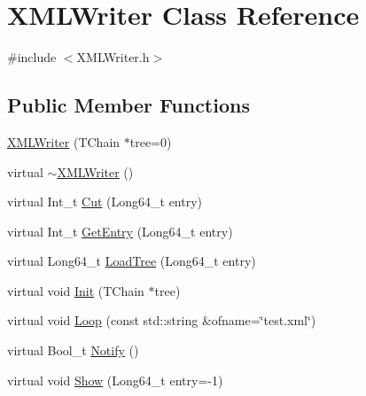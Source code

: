 \hypertarget{classXMLWriter}{}\section{X\+M\+L\+Writer Class Reference}
\label{classXMLWriter}


{\ttfamily \#include $<$X\+M\+L\+Writer.\+h$>$}

\subsection*{Public Member Functions}
\begin{DoxyCompactItemize}
\item 
\hyperlink{classXMLWriter_a631d31e75126744e81192ac344a2b7dc}{X\+M\+L\+Writer} (T\+Chain $\ast$tree=0)
\item 
virtual \hyperlink{classXMLWriter_a1336f66fb7a5df23cb7a36f86d6716e6}{$\sim$\+X\+M\+L\+Writer} ()
\item 
virtual Int\+\_\+t \hyperlink{classXMLWriter_aea4173005cf384e509c2ef2f3000605c}{Cut} (Long64\+\_\+t entry)
\item 
virtual Int\+\_\+t \hyperlink{classXMLWriter_a599d7b24c232fc328e78be3c6cc3db4e}{Get\+Entry} (Long64\+\_\+t entry)
\item 
virtual Long64\+\_\+t \hyperlink{classXMLWriter_ac26022656f980ea11451578450ab717f}{Load\+Tree} (Long64\+\_\+t entry)
\item 
virtual void \hyperlink{classXMLWriter_ae96e7d80914edf14da1f0e4f9b473dd2}{Init} (T\+Chain $\ast$tree)
\item 
virtual void \hyperlink{classXMLWriter_abeef9c4db869ff2ea081efa155675ce1}{Loop} (const std\+::string \&ofname=\char`\"{}test.\+xml\char`\"{})
\item 
virtual Bool\+\_\+t \hyperlink{classXMLWriter_ae2fba36e6d07bb3b4cefa1989fac3611}{Notify} ()
\item 
virtual void \hyperlink{classXMLWriter_ac3b6c5418fd5eddc0b87b3d320503e70}{Show} (Long64\+\_\+t entry=-\/1)
\end{DoxyCompactItemize}
